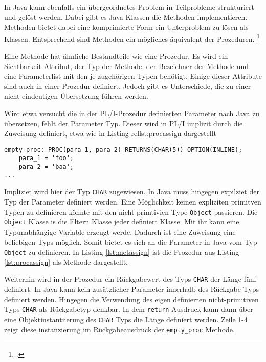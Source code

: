 {In Java kann ebenfalls ein übergeordnetes Problem in Teilprobleme strukturiert und gelöst werden.
Dabei gibt es Java Klassen die Methoden implementieren. Methoden bietet dabei eine komprimierte Form ein Unterproblem zu lösen als Klassen.
Entsprechend sind Methoden ein mögliches äquivalent der Prozeduren. \footcite[Vgl. ][]{oracle}

Eine Methode hat ähnliche Bestandteile wie eine Prozedur.
Es wird ein Sichtbarkeit Attribut, der Typ der Methode, der Bezeichner der Methode und eine Parameterlist mit den je zugehörigen Typen benötigt.
Einige dieser Attribute sind auch in einer Prozedur definiert.
Jedoch gibt es Unterschiede, die zu einer nicht eindeutigen Übersetzung führen werden.

Wird etwa versucht die in der PL/I-Prozedur definierten Parameter nach Java zu übersetzen, fehlt der Parameter Typ.
Dieser wird in PL/I implizit durch die Zuweisung definiert, etwa wie in Listing ref{lst:procassign} dargestellt

\begin{lstlisting}[language=PL/I, caption=Zuweisung von Variablen in einer Prozedur, label={lst:procassign}]
empty_proc: PROC(para_1, para_2) RETURNS(CHAR(5)) OPTION(INLINE);
	para_1 = 'foo';
	para_2 = 'baa';
...
\end{lstlisting}

Impliziet wird hier der Typ \verb+CHAR+ zugewiesen.
In Java muss hingegen expilziet der Typ der Parameter definiert werden.
Eine M\"oglichkeit keinen expliziten primitven Typen zu definieren k\"onnte mit den nicht-primtivien Type \verb+Object+ passieren.
Die \verb+Object+ Klasse is die Eltern Klasse jeder definiert Klasse. Mit ihr kann eine Typunabh\"angige Variable erzeugt werde.
Dadurch ist eine Zuweisung eine beliebigen Typs m\"oglich. Somit bietet es sich an die Parameter in Java vom Typ \verb+Object+
zu definieren.
In Listing \ref{lst:metassign} ist die Prozedur aus Listing \ref{lst:procassign} als Methode dargestellt.

Weiterhin wird in der Prozedur ein R\"uckgabewert des Typs \verb+CHAR+ der L\"ange f\"unf definiert.
In Java kann kein zus\"atzlicher Parameter innerhalb des R\"uckgabe Typs definiert werden.
Hingegen die Verwendung des eigen definierten nicht-primitiven Typs \verb+CHAR+ als R\"uckgabetyp denkbar.
In dem \verb+return+ Ausdruck kann dann \"uber eine Objektinstantiierung des \verb+CHAR+ Typs die L\"ange definiert werden.
Zeile 1-4 zeigt diese instanzierung im R\"uckgabeausdruck der \verb+empty_proc+ Methode.

}

